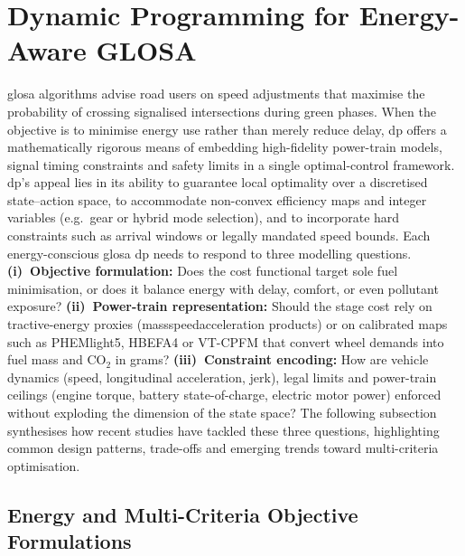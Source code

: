 \section{Dynamic Programming for Energy-Aware GLOSA}
\label{sec:eco_glosa}

\ac{glosa} algorithms advise road users on speed adjustments that maximise the probability of crossing signalised intersections during green phases.  When the objective is to minimise energy use rather than merely reduce delay, \ac{dp} offers a mathematically rigorous means of embedding high-fidelity power-train models, signal timing constraints and safety limits in a single optimal-control framework. \ac{dp}’s appeal lies in its ability to guarantee local optimality over a discretised state–action space, to accommodate non-convex efficiency maps and integer variables (e.g.\ gear or hybrid mode selection), and to incorporate hard constraints such as arrival windows or legally mandated speed bounds.
\mynewline
Each energy-conscious \ac{glosa} \ac{dp} needs to respond to three modelling questions. \textbf{(i)~Objective formulation:} Does the cost functional target sole fuel minimisation, or does it balance energy with delay, comfort, or even pollutant exposure? \textbf{(ii)~Power-train representation:} Should the stage cost rely on tractive-energy proxies (mass\-speed\–acceleration products) or on calibrated maps such as PHEMlight5, HBEFA4 or VT-CPFM that convert wheel demands into fuel mass and CO$_2$ in grams? \textbf{(iii)~Constraint encoding:} How are vehicle dynamics (speed, longitudinal acceleration, jerk), legal limits and power-train ceilings (engine torque, battery state-of-charge, electric motor power) enforced without exploding the dimension of the state space? The following subsection synthesises how recent studies have tackled these three questions, highlighting common design patterns, trade-offs and emerging trends toward multi-criteria optimisation.

\subsection{Energy and Multi-Criteria Objective Formulations}
\label{subsec:eco_dp_objectives}

